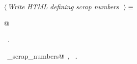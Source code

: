 \documentclass{report}
\begin{document}
\begin{flushleft} \small
\begin{minipage}{\linewidth} \label{scrap123}
$\langle\,${\it Write HTML defining scrap numbers}\nobreak\ {\footnotesize {}}$\,\rangle\equiv$
\vspace{-1ex}
\begin{list}{}{} \item
\mbox{}@{\NWsep}
\end{list}
\vspace{-1ex}
\footnotesize\addtolength{\baselineskip}{-1ex}
\begin{list}{}{\setlength{\itemsep}{-\parsep}\setlength{\itemindent}{-\leftmargin}}
\item \NWtxtMacroRefIn\ .
\end{list}
\vspace{-2ex}
\footnotesize\addtolength{\baselineskip}{-1ex}
\begin{list}{}{\setlength{\itemsep}{-\parsep}\setlength{\itemindent}{-\leftmargin}}
\item \NWtxtIdentsUsed\nobreak\  \verb@display_scrap_numbers@\nobreak\ , \verb@putc@\nobreak\ .\end{list}
\end{minipage}\\[4ex]
\end{flushleft}
\end{document}
